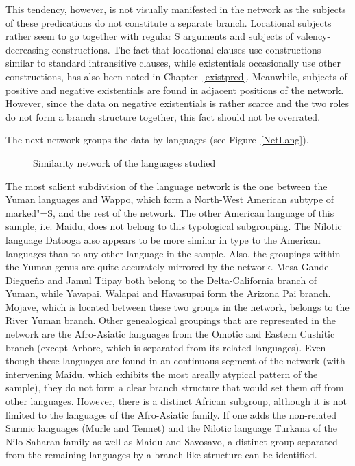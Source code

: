 This tendency, however, is not visually manifested in the network as the subjects of these predications do not constitute a separate branch. 
Locational subjects rather seem to go together with regular S arguments and subjects of valency-decreasing constructions. 
The fact that locational clauses use constructions similar to standard intransitive clauses, while existentials occasionally use other constructions, has also been noted in Chapter~\ref{existpred}. 
Meanwhile, subjects of positive and negative existentials are found in adjacent positions of the network. 
However, since the data on negative existentials is rather scarce and the two roles do not form a branch structure together, this fact should not be overrated. 


The next network groups the data by languages (see Figure~\vref{NetLang}). 
\begin{figure}[h,t,b,p] \centering {}%
\caption{Similarity network of the languages studied}\label{NetLang}
\end{figure}
The most salient subdivision of the language network is the one between the Yuman languages and Wappo, which form a North-West American subtype of marked"=S, and the rest of the network. 
The other American language of this sample, i.e. Maidu, does not belong to this typological subgrouping. 
The Nilotic language Datooga also appears to be more similar in type to the American languages than to any other language in the sample. 
Also, the groupings within the Yuman genus are quite accurately mirrored by the network. Mesa Gande Diegue\~no and Jamul Tiipay both belong to the Delta-California branch of Yuman, while Yavapai, Walapai and Havasupai form the Arizona Pai branch. 
Mojave, which is located between these two groups in the network, belongs to the River Yuman branch. 
Other genealogical groupings that are represented in the network are the Afro-Asiatic languages from the Omotic and Eastern Cushitic branch (except Arbore, which is separated from its related languages).
Even though these languages are found in an continuous segment of the network (with intervening Maidu, which exhibits the most areally atypical pattern of the sample), they do not form a clear branch structure that would set them off from other languages. 
However, there is a distinct African subgroup, although it is not limited to the languages of the Afro-Asiatic family. 
If one adds the non-related Surmic languages (Murle and Tennet) and the Nilotic language Turkana of the Nilo-Saharan family as well as Maidu and Savosavo, a distinct group separated from the remaining languages by a branch-like structure can be identified. 

